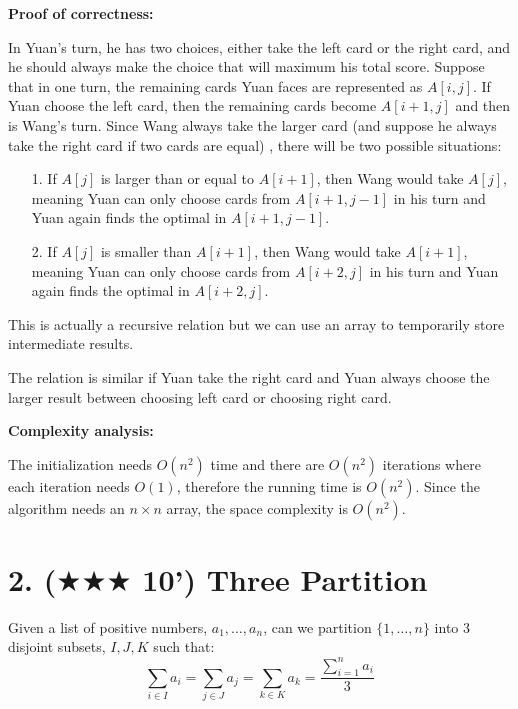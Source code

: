 \documentclass{article}
\begin{document}
{\begin{enumerate}
		\par\textbf{Proof of correctness: }		\par In Yuan's turn, he has two choices, either take the left card or the right card, and he should always make the choice that will maximum his total score. Suppose that in one turn, the remaining cards Yuan faces are represented as $A[i,j]$. If Yuan choose the left card, then the remaining cards become $A[i+1,j]$ and then is Wang's turn. Since Wang always take the larger card (and suppose he always take the right card if two cards are equal) , there will be two possible situations: 
		\begin{enumerate}
			\item[1.] If $A[j]$ is larger than or equal to $A[i+1]$, then Wang would take $A[j]$, meaning Yuan can only choose cards from $A[i+1,j-1]$ in his turn and Yuan again finds the optimal in $A[i+1,j-1]$.
			\item[2.] If $A[j]$ is smaller than $A[i+1]$, then Wang would take $A[i+1]$, meaning Yuan can only choose cards from $A[i+2,j]$ in his turn and Yuan again finds the optimal in $A[i+2,j]$.
		\end{enumerate}
		\par This is actually a recursive relation but we can use an array to temporarily store intermediate results.
		\par The relation is similar if Yuan take the right card and Yuan always choose the larger result between choosing left card or choosing right card.\\

		\par\textbf{Complexity analysis: }
		\par The initialization needs $O(n^2)$ time and there are $O(n^2)$ iterations where each iteration needs $O(1)$, therefore the running time is $O(n^2)$. Since the algorithm needs an $n\times n$ array, the space complexity is $O(n^2)$.
\end{enumerate}
}

\pagebreak
\section*{2. ($\bigstar\bigstar\bigstar$ 10') Three Partition}
Given a list of positive numbers, $a_1,\dots,a_n$, can we partition $\{1,\dots,n\}$ into 3 disjoint subsets, $I,J,K$ such that:
\[ \sum_{i\in I}a_i = \sum_{j\in J}a_j = \sum_{k\in K} a_k = \frac{\sum\limits_{i=1}^{n}a_i}{3} \]
\end{document}
